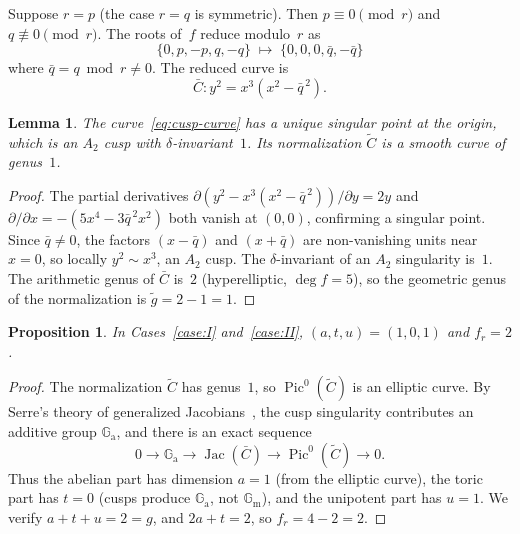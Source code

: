 \documentclass[11pt,a4paper]{article}
\newcommand{\Jac}{\operatorname{Jac}}
\newcommand{\Pic}{\operatorname{Pic}}
\newcommand{\Gm}{\mathbb{G}_{\mathrm{m}}}
\newcommand{\Ga}{\mathbb{G}_{\mathrm{a}}}
\newtheorem{proposition}[theorem]{Proposition}
\newtheorem{lemma}[theorem]{Lemma}
\theoremstyle{definition}
\theoremstyle{remark}
\begin{document}
Suppose $r = p$ (the case $r = q$ is symmetric).
Then $p \equiv 0 \pmod{r}$ and $q \not\equiv 0 \pmod{r}$.
The roots of~$f$ reduce modulo~$r$ as
\[
  \{0, p, -p, q, -q\}
  \;\longmapsto\;
  \{0, 0, 0, \bar{q}, -\bar{q}\}
\]
where $\bar{q} = q \bmod r \ne 0$.  The reduced curve is
\begin{equation}\label{eq:cusp-curve}
  \bar{C}\colon y^2 = x^3(x^2 - \bar{q}^{\,2}).
\end{equation}

\begin{lemma}\label{lem:cusp}
  The curve~\eqref{eq:cusp-curve} has a unique singular point
  at the origin, which is an $A_2$ cusp with
  $\delta$-invariant~$1$.
  Its normalization $\widetilde{C}$ is a smooth curve of genus~$1$.
\end{lemma}

\begin{proof}
  The partial derivatives $\partial(y^2 - x^3(x^2 - \bar{q}^{\,2}))/\partial y = 2y$
  and $\partial/\partial x = -(5x^4 - 3\bar{q}^{\,2} x^2)$
  both vanish at $(0, 0)$, confirming a singular point.
  Since $\bar{q} \ne 0$, the factors $(x - \bar{q})$ and
  $(x + \bar{q})$ are non-vanishing units near $x = 0$, so
  locally $y^2 \sim x^3$, an $A_2$ cusp.
  The $\delta$-invariant of an $A_2$ singularity is~$1$.
  The arithmetic genus of $\bar{C}$ is~$2$ (hyperelliptic,
  $\deg f = 5$), so the geometric genus of the normalization
  is $\tilde{g} = 2 - 1 = 1$.
\end{proof}

\begin{proposition}\label{prop:cusp-neron}
  In Cases~\ref{case:I} and~\ref{case:II},
  $(a, t, u) = (1, 0, 1)$ and $f_r = 2$.
\end{proposition}

\begin{proof}
  The normalization $\widetilde{C}$ has genus~$1$, so
  $\Pic^0(\widetilde{C})$ is an elliptic curve.
  By Serre's theory of generalized Jacobians~\cite{Serre1959},
  the cusp singularity contributes an additive group $\Ga$, and
  there is an exact sequence
  \[
    0 \longrightarrow \Ga \longrightarrow
    \Jac(\bar{C}) \longrightarrow
    \Pic^0(\widetilde{C}) \longrightarrow 0.
  \]
  Thus the abelian part has dimension $a = 1$
  (from the elliptic curve), the toric part has $t = 0$
  (cusps produce $\Ga$, not $\Gm$), and the unipotent
  part has $u = 1$.  We verify $a + t + u = 2 = g$, and
  $2a + t = 2$, so $f_r = 4 - 2 = 2$.
\end{proof}
\end{document}
